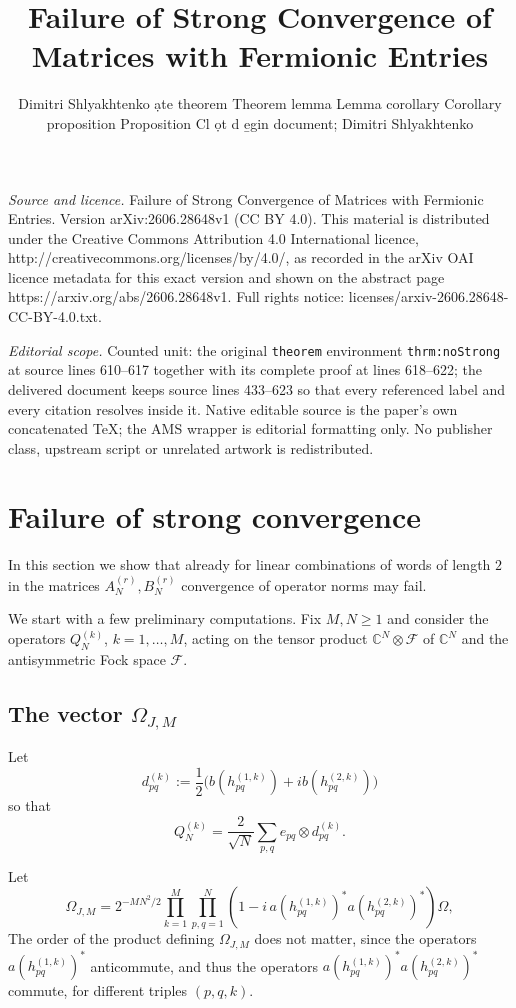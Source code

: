 \documentclass[10pt,a4paper]{amsart}
\begin{document}
\title[Failure of Strong Convergence of Matrices with Fermionic Ent]{Failure of Strong Convergence of Matrices with Fermionic Entries}
\author{Dimitri Shlyakhtenko ạte theorem Theorem lemma Lemma corollary Corollary proposition Proposition Cl ọt d e̱gin document; Dimitri Shlyakhtenko}
\date{}
\maketitle
\noindent\emph{Source and licence.} Failure of Strong Convergence of Matrices with Fermionic Entries. Version arXiv:2606.28648v1 (CC BY 4.0). This material is distributed under the Creative Commons Attribution 4.0 International licence, http://creativecommons.org/licenses/by/4.0/, as recorded in the arXiv OAI licence metadata for this exact version and shown on the abstract page https://arxiv.org/abs/2606.28648v1. Full rights notice: licenses/arxiv-2606.28648-CC-BY-4.0.txt.\par\smallskip
\noindent\textit{Editorial scope.} Counted unit: the original \texttt{theorem} environment \texttt{thrm:noStrong} at source lines 610--617 together with its complete proof at lines 618--622; the delivered document keeps source lines 433--623 so that every referenced label and every citation resolves inside it. Native editable source is the paper's own concatenated TeX; the AMS wrapper is editorial formatting only. No publisher class, upstream script or unrelated artwork is redistributed.
\section{Failure of strong convergence}
In this section we show that already for linear combinations of words of length $2$ in the matrices $A_N^{(r)}, B_N^{(r)}$ convergence of operator norms may fail.

We start with a few preliminary computations. Fix $M,N\geq 1$ and consider the operators $Q_N^{(k)}$, $k=1,\dots,M$, acting on the tensor product $\mathbb{C}^N\otimes \mathscr{F}$ of $\mathbb{C}^N$ and the antisymmetric Fock space $\mathscr{F}$. 

\subsection{The vector $\Omega_{J,M}$}
Let \[
d^{(k)}_{pq}:=\frac12\bigl(b(h^{(1,k)}_{pq})+i b(h^{(2,k)}_{pq})\bigr)
\] so that 
\[ Q_N^{(k)} = \frac{2}{\sqrt{N}}\sum_{p,q} e_{pq} \otimes  d^{(k)}_{pq}.\]

Let 
\[
    \Omega_{J,M}
    =
    2^{-MN^2/2}
    \prod_{k=1}^M\prod_{p,q=1}^N
    \left(
      1-i\,a(h^{(1,k)}_{pq})^*a(h^{(2,k)}_{pq})^*
    \right)\Omega,
\]
The order of the product defining $\Omega_{J,M}$ does not matter, since the operators $a(h^{(1,k)}_{pq})^*$ anticommute, and thus the operators $a(h^{(1,k)}_{pq})^*a(h^{(2,k)}_{pq})^*$ commute, for different triples $(p,q,k)$.
\end{document}

